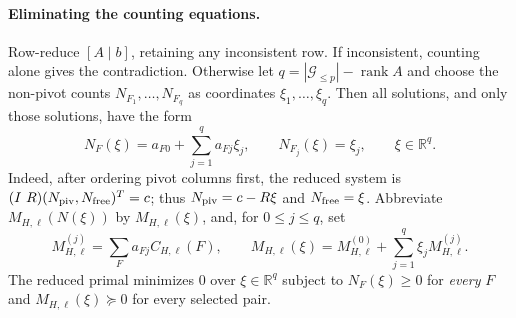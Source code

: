 \documentclass[11pt]{article}
\theoremstyle{remark}
\newcommand{\R}{\mathbb R}
\DeclareMathOperator{\rank}{rank}
\numberwithin{equation}{section}
\begin{document}
\paragraph{Eliminating the counting equations.}\label{subsec:elimination}
Row-reduce $[A\mid b]$, retaining any inconsistent row. If inconsistent,
counting alone gives the contradiction. Otherwise let
$q=|\mathcal G_{\le p}|-\rank A$ and choose the non-pivot counts
$N_{F_1},\ldots,N_{F_q}$ as coordinates $\xi_1,\ldots,\xi_q$.
Then all solutions, and only those solutions, have the form
\begin{equation}\label{eq:affine}
 N_F(\xi)=a_{F0}+\sum_{j=1}^q a_{Fj}\xi_j,
 \qquad N_{F_j}(\xi)=\xi_j,\qquad \xi\in\R^q.
\end{equation}
Indeed, after ordering pivot columns first, the reduced system is
$(I\ R)(N_{\rm piv},N_{\rm free})^T=c$; thus
$N_{\rm piv}=c-R\xi$ and $N_{\rm free}=\xi$.
Abbreviate $M_{H,\ell}(N(\xi))$ by $M_{H,\ell}(\xi)$, and, for
$0\le j\le q$, set
\begin{equation}\label{eq:Mj}
 M_{H,\ell}^{(j)}=\sum_Fa_{Fj}C_{H,\ell}(F),\qquad
 M_{H,\ell}(\xi)=M_{H,\ell}^{(0)}+
 \sum_{j=1}^q\xi_jM_{H,\ell}^{(j)}.
\end{equation}
The reduced primal minimizes $0$ over $\xi\in\R^q$ subject to
$N_F(\xi)\ge0$ for \emph{every} $F$ and
$M_{H,\ell}(\xi)\succeq0$ for every selected pair.
\end{document}
